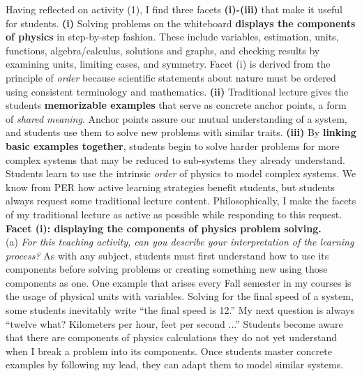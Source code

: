 \documentclass[../../../main.tex]{subfiles}
\begin{document}
Having reflected on activity (1), I find three facets \textbf{(i)-(iii)} that make it useful for students. \textbf{(i)} Solving problems on the whiteboard \textbf{displays the components of physics} in step-by-step fashion.  These include variables, estimation, units, functions, algebra/calculus, solutions and graphs, and checking results by examining units, limiting cases, and symmetry.  Facet (i) is derived from the principle of \textit{order} because scientific statements about nature must be ordered using consistent terminology and mathematics. \textbf{(ii)} Traditional lecture gives the students \textbf{memorizable examples} that serve as concrete anchor points, a form of \textit{shared meaning}.  Anchor points assure our mutual understanding of a system, and students use them to solve new problems with similar traits.  \textbf{(iii)} By \textbf{linking basic examples together}, students begin to solve harder problems for more complex systems that may be reduced to sub-systems they already understand.  Students learn to use the intrinsic \textit{order} of physics to model complex systems.  We know from PER how active learning strategies benefit students, but students always request some traditional lecture content.  Philosophically, I make the facets of my traditional lecture as active as possible while responding to this request.
\\
\vspace{0.25cm}
\textbf{Facet (i): displaying the components of physics problem solving.}
\\
\vspace{0.25cm}
(a) \textit{For this teaching activity, can you describe your interpretation of the learning process?}  As with any subject, students must first understand how to use its components before solving problems or creating something new using those components as one.  One example that arises every Fall semester in my courses is the usage of physical units with variables.  Solving for the final speed of a system, some students inevitably write ``the final speed is 12.''  My next question is always ``twelve what? Kilometers per hour, feet per second ...'' Students become aware that there are components of physics calculations they do not yet understand when I break a problem into its components.  Once students master concrete examples by following my lead, they can adapt them to model similar systems.
\\
\vspace{0.25cm}
\end{document}
